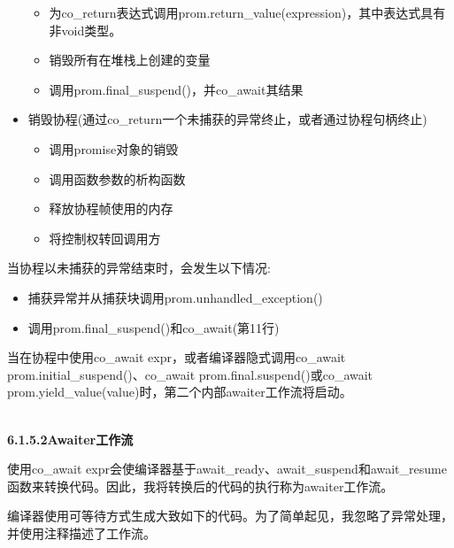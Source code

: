 \begin{itemize}
\begin{itemize}
\item 
为co\_return表达式调用prom.return\_value(expression)，其中表达式具有非void类型。

\item 
销毁所有在堆栈上创建的变量

\item 
调用prom.final\_suspend()，并co\_await其结果
\end{itemize}

\item 
销毁协程(通过co\_return一个未捕获的异常终止，或者通过协程句柄终止)
\begin{itemize}
\item 
调用promise对象的销毁

\item 
调用函数参数的析构函数

\item 
释放协程帧使用的内存

\item 
将控制权转回调用方
\end{itemize}
\end{itemize}

当协程以未捕获的异常结束时，会发生以下情况:

\begin{itemize}
\item 
捕获异常并从捕获块调用prom.unhandled\_exception()

\item 
调用prom.final\_suspend()和co\_await(第11行)
\end{itemize}

当在协程中使用co\_await expr，或者编译器隐式调用co\_await prom.initial\_suspend()、co\_await prom.final.suspend()或co\_await prom.yield\_value(value)时，第二个内部awaiter工作流将启动。

\hspace*{\fill} \\ %
\noindent
\textbf{6.1.5.2\hspace{0.2cm}Awaiter工作流}

使用co\_await expr会使编译器基于await\_ready、await\_suspend和await\_resume函数来转换代码。因此，我将转换后的代码的执行称为awaiter工作流。

编译器使用可等待方式生成大致如下的代码。为了简单起见，我忽略了异常处理，并使用注释描述了工作流。

